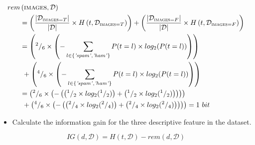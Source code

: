 \documentclass[xcolor={table}]{beamer}
\newcommand{\featN}[1]{\textsc{#1}}
\newcommand{\featL}[1]{\textit{'#1'}}
\begin{document}
 \begin{frame} 
\begin{footnotesize}
\begin{equation*}
\begin{alignedat}{2}
rem&\left(\text{\featN{images}},\mathcal{D}\right)\\
&= \left(\frac{|\mathcal{D}_{\text{\featN{images}}=T}|}{|\mathcal{D}|} \times H\left(t,\mathcal{D}_{\text{\featN{images}}=T}\right) \right) + \left(\frac{|\mathcal{D}_{\text{\featN{images}}=F}|}{|\mathcal{D}|} \times H\left(t,\mathcal{D}_{\text{\featN{images}}=F}\right) \right) \\
&= \left(^2/_6 \times \left(-\sum_{l \in \{\text{\featL{spam}},\text{\featL{ham}}\}} P(t=l) \times log_2(P(t=l))\right) \right) \\
&~+ \left( ^4/_6 \times \left(-\sum_{l \in \{\text{\featL{spam}},\text{\featL{ham}}\}} P(t=l) \times log_2(P(t=l)) \right)\right)\\
&=
\left(
^2/_6 \times
\left( - \left(
\left( ^1/_2 \times log_2( ^1/_2) \right)
+
\left( ^1/_2 \times log_2( ^1/_2) \right)
\right)
\right)
\right)
\\
&~+
\left( ^4/_6 \times
\left( - \left(
\left( ^2/_4 \times log_2( ^2/_4) \right)
+
\left( ^2/_4 \times log_2( ^2/_4) \right)
\right)
\right)
\right) = 1~bit
\end{alignedat}
\label{eq:remainderci}
\end{equation*}
\end{footnotesize}
\end{frame} 

\begin{frame}
	\begin{itemize}
		\item Calculate the \alert{information gain} for the three descriptive feature in the dataset.
	\end{itemize}
\begin{equation*}
IG\left(d,\mathcal{D}\right) = H\left(t,\mathcal{D}\right) - rem\left(d, \mathcal{D}\right)
\label{eq:info-gain}
\end{equation*}
\end{frame}
\end{document}

